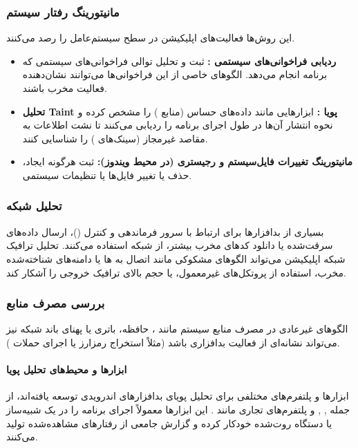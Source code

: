 \subsubsection{مانیتورینگ رفتار سیستم}
این روش‌ها فعالیت‌های اپلیکیشن در سطح سیستم‌عامل را رصد می‌کنند.
\begin{itemize}
    \item \textbf{ردیابی فراخوانی‌های سیستمی :} ثبت و تحلیل توالی فراخوانی‌های سیستمی که برنامه انجام می‌دهد. الگوهای خاصی از این فراخوانی‌ها می‌توانند نشان‌دهنده فعالیت مخرب باشند.
    \item \textbf{تحلیل Taint پویا :} ابزارهایی مانند  داده‌های حساس (منابع ) را مشخص کرده و نحوه انتشار آن‌ها در طول اجرای برنامه را ردیابی می‌کنند تا نشت اطلاعات به مقاصد غیرمجاز (سینک‌های ) را شناسایی کنند.
    \item \textbf{مانیتورینگ تغییرات فایل‌سیستم و رجیستری (در محیط ویندوز):} ثبت هرگونه ایجاد، حذف یا تغییر فایل‌ها یا تنظیمات سیستمی.
\end{itemize}

\subsubsection{تحلیل شبکه}
بسیاری از بدافزارها برای ارتباط با سرور فرماندهی و کنترل ()، ارسال داده‌های سرقت‌شده یا دانلود کدهای مخرب بیشتر، از شبکه استفاده می‌کنند. تحلیل ترافیک شبکه اپلیکیشن می‌تواند الگوهای مشکوکی مانند اتصال به ها یا دامنه‌های شناخته‌شده مخرب، استفاده از پروتکل‌های غیرمعمول، یا حجم بالای ترافیک خروجی را آشکار کند.

\subsubsection{بررسی مصرف منابع}
الگوهای غیرعادی در مصرف منابع سیستم مانند ، حافظه، باتری یا پهنای باند شبکه نیز می‌تواند نشانه‌ای از فعالیت بدافزاری باشد (مثلاً استخراج رمزارز یا اجرای حملات ).

\paragraph{ابزارها و محیط‌های تحلیل پویا}
ابزارها و پلتفرم‌های مختلفی برای تحلیل پویای بدافزارهای اندرویدی توسعه یافته‌اند، از جمله , ,  و پلتفرم‌های تجاری مانند . این ابزارها معمولاً اجرای برنامه را در یک شبیه‌ساز یا دستگاه روت‌شده خودکار کرده و گزارش جامعی از رفتارهای مشاهده‌شده تولید می‌کنند.

